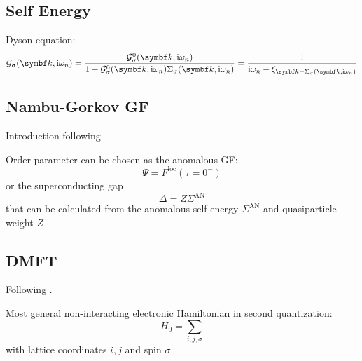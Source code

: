 \documentclass[../notes.tex]{subfiles}
\begin{document}

\subsection*{Self Energy}




Dyson equation:
\begin{equation}
	\mathcal{G}_{\sigma} (\vb{k}, \iu \omega_n) = \frac{\mathcal{G}_{\sigma}^0 (\vb{k}, \iu \omega_n)}{1 - \mathcal{G}_{\sigma}^0 (\vb{k}, \iu \omega_n) \Sigma_{\sigma} (\vb{k}, \iu \omega_n)} = \frac{1}{\iu \omega_n - \xi_{\vb{k} - \Sigma_{\sigma} (\vb{k}, \iu \omega_n)}}
\end{equation}


\subsection*{Nambu-Gorkov GF}

Introduction following~\cite[ch. 14.7]{colemanIntroductionManyBodyPhysics2015}


Order parameter can be chosen as the anomalous GF:
\begin{equation}
	\Psi = F^{\mathrm{loc}} (\tau = 0^-)
\end{equation}
or the superconducting gap
\begin{equation}
	\Delta = Z \Sigma^{\mathrm{AN}}
\end{equation}
that can be calculated from the anomalous self-energy \(\Sigma^{\mathrm{AN}}\) and quasiparticle weight \(Z\)


\subsection*{DMFT}

Following \cite{georgesDynamicalMeanfieldTheory1996}.

Most general non-interacting electronic Hamiltonian in second quantization:
\begin{equation}
	H_0 = \sum_{i, j, \sigma}
\end{equation}
with lattice coordinates \(i, j\) and spin \(\sigma\).
\end{document}
